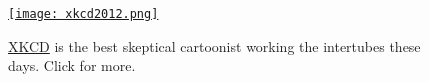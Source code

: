 \captionsetup[figure]{labelformat=empty}
\begin{figure}[htbp]
\centering
\href{https://xkcd.com/}{\texttt{[image: xkcd2012.png]}}
\caption{\href{https://xkcd.com/}{XKCD} is the best skeptical cartoonist working the intertubes these days. Click for more.}
\label{fig:3575X0}
\end{figure}





%